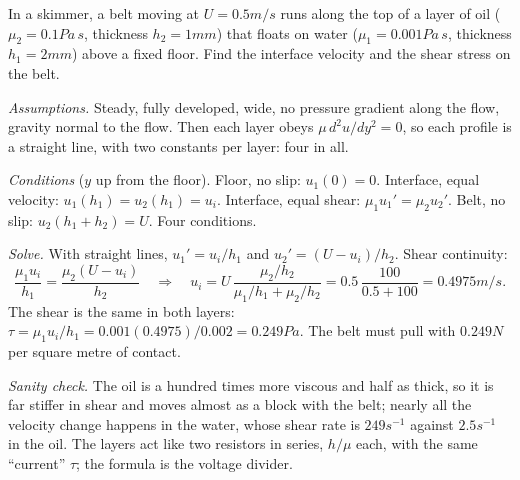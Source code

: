 \begin{example}
In a skimmer, a belt moving at $U = 0.5\unit{m/s}$ runs along the top of a layer of oil ($\mu_2 = 0.1\unit{Pa\,s}$, thickness $h_2 = 1\unit{mm}$) that floats on water ($\mu_1 = 0.001\unit{Pa\,s}$, thickness $h_1 = 2\unit{mm}$) above a fixed floor. Find the interface velocity and the shear stress on the belt.

\emph{Assumptions.} Steady, fully developed, wide, no pressure gradient along the flow, gravity normal to the flow. Then each layer obeys $\mu\,d^2u/dy^2 = 0$, so each profile is a straight line, with two constants per layer: four in all.

\emph{Conditions} ($y$ up from the floor). Floor, no slip: $u_1(0) = 0$. Interface, equal velocity: $u_1(h_1) = u_2(h_1) = u_i$. Interface, equal shear: $\mu_1 u_1' = \mu_2 u_2'$. Belt, no slip: $u_2(h_1 + h_2) = U$. Four conditions.

\emph{Solve.} With straight lines, $u_1' = u_i/h_1$ and $u_2' = (U - u_i)/h_2$. Shear continuity:
\[
\frac{\mu_1 u_i}{h_1} = \frac{\mu_2(U - u_i)}{h_2}
\quad\Longrightarrow\quad
u_i = U\,\frac{\mu_2/h_2}{\mu_1/h_1 + \mu_2/h_2} = 0.5\,\frac{100}{0.5 + 100} = 0.4975\unit{m/s}.
\]
The shear is the same in both layers: $\tau = \mu_1 u_i/h_1 = 0.001(0.4975)/0.002 = 0.249\unit{Pa}$. The belt must pull with $0.249\unit{N}$ per square metre of contact.

\emph{Sanity check.} The oil is a hundred times more viscous and half as thick, so it is far stiffer in shear and moves almost as a block with the belt; nearly all the velocity change happens in the water, whose shear rate is $249\unit{s^{-1}}$ against $2.5\unit{s^{-1}}$ in the oil. The layers act like two resistors in series, $h/\mu$ each, with the same ``current'' $\tau$; the formula is the voltage divider.
\end{example}

